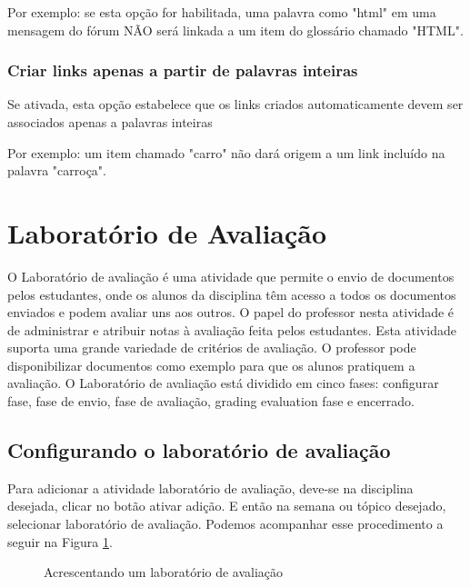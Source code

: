Por exemplo: se esta opção for habilitada, uma palavra como "html" em uma mensagem do fórum NÃO será linkada a um item do glossário chamado "HTML".
\subsubsection{Criar links apenas a partir de palavras inteiras}
Se ativada, esta opção estabelece que os links criados automaticamente devem ser associados apenas a palavras inteiras

Por exemplo: um item chamado "carro" não dará origem a um link incluído na palavra "carroça".

\section{Laboratório de Avaliação}
O Laboratório de avaliação é uma atividade que permite o envio de documentos pelos estudantes, onde os alunos da disciplina têm acesso a todos os documentos enviados e podem avaliar uns aos outros. O papel do professor nesta atividade é de administrar e atribuir notas à avaliação feita pelos estudantes. Esta atividade suporta uma grande variedade de critérios de avaliação. O professor pode disponibilizar documentos como exemplo para que os alunos pratiquem a avaliação. O Laboratório de avaliação está dividido em cinco fases: configurar fase, fase de envio, fase de avaliação, grading evaluation fase e encerrado.
\subsection{Configurando o laboratório de avaliação}
Para adicionar a atividade laboratório de avaliação, deve-se na disciplina desejada, clicar no botão ativar adição. E então na semana ou tópico desejado, selecionar laboratório de avaliação. Podemos acompanhar esse procedimento a seguir na Figura \ref{fig:config_lab}.

\begin{figure}
 \begin{center}
  \caption{Acrescentando um laboratório de avaliação}
  \label{fig:config_lab}
 \end{center}
\end{figure}

